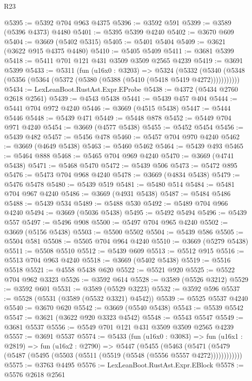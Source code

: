 \begin{lexlean}{R23}
\begin{coremodule}
@5395 := @5392 @704 @963 @4375
@5396 := @3592 @591
@5399 := @3589 (@5396 @4373) @4480
@5401 := @5395 @5399 @4240
@5402 := @3670 @609
@5404 := @3669 (@5402 @5315)
@5405 := @5401 @5404
@5409 := @3621 (@3622 @915 @4375 @4480)
@5410 := @5405 @5409
@5411 := @3681 @5399
@5418 := @5411 @701 @121 @431 @3509 @3509 @2565 @4239
@5419 := @3691 @5399
@5433 := @5311
    (fun (u16x0 : @3203) =>
    @5324
      (@5332 (@5340 (@5348 (@5356 (@5364 (@5372 (@5380 (@5388 (@5410 (@5418 @5419 @4272)))))))))))
@5434 := LexLeanBoot.RustAst.Expr.EProbe
@5438 := @4372 (@5434 @2760 @2618 @2561)
@5439 := @4543 @5438
@5441 := @5439 @457 @404
@5444 := @5441 @704 @972 @4240
@5446 := @3669 (@4515 @5438)
@5447 := @5444 @5446
@5448 := @5439 @471
@5449 := @5448 @878
@5452 := @5449 @704 @971 @4240
@5454 := @3669 (@4577 @5438)
@5455 := @5452 @5454
@5456 := @5439 @482
@5457 := @5456 @478
@5460 := @5457 @704 @970 @4240
@5462 := @3669 (@4649 @5438)
@5463 := @5460 @5462
@5464 := @5439 @493
@5465 := @5464 @888
@5468 := @5465 @704 @969 @4240
@5470 := @3669 (@4741 @5438)
@5471 := @5468 @5470
@5472 := @5439 @506
@5473 := @5472 @895
@5476 := @5473 @704 @968 @4240
@5478 := @3669 (@4834 @5438)
@5479 := @5476 @5478
@5480 := @5439 @519
@5481 := @5480 @514
@5484 := @5481 @704 @967 @4240
@5486 := @3669 (@4931 @5438)
@5487 := @5484 @5486
@5488 := @5439 @534
@5489 := @5488 @530
@5492 := @5489 @704 @966 @4240
@5494 := @3669 (@5036 @5438)
@5495 := @5492 @5494
@5496 := @5439 @557
@5497 := @5496 @908
@5500 := @5497 @704 @965 @4240
@5502 := @3669 (@5156 @5438)
@5503 := @5500 @5502
@5504 := @5439 @586
@5505 := @5504 @581
@5508 := @5505 @704 @964 @4240
@5510 := @3669 (@5279 @5438)
@5511 := @5508 @5510
@5512 := @5439 @609
@5513 := @5512 @915
@5516 := @5513 @704 @963 @4240
@5518 := @3669 (@5402 @5438)
@5519 := @5516 @5518
@5521 := @4558 @5438 @620
@5522 := @5521 @920
@5525 := @5522 @704 @962 @3323
@5526 := @3592 @614
@5528 := @3589 (@5526 @3212)
@5529 := @3592 @601
@5531 := @3589 (@5529 @3223)
@5532 := @3592 @596
@5537 := @5528 (@5531 (@3589 (@5532 @3321) @4542))
@5539 := @5525 @5537 @4240
@5540 := @3670 @620
@5542 := @3669 (@5540 @5438)
@5543 := @5539 @5542
@5547 := @3621 (@3622 @920 @3323 @4542)
@5548 := @5543 @5547
@5549 := @3681 @5537
@5556 := @5549 @701 @121 @431 @3509 @3509 @2565 @4239
@5557 := @3691 @5537
@5574 := @5433
    (fun (u16x0 : @3083) =>
    fun (u16x1 : @2819) =>
    fun (u16x2 : @2790) =>
    @5447
      (@5455
        (@5463
          (@5471 (@5479 (@5487 (@5495 (@5503 (@5511 (@5519 (@5548 (@5556 @5557 @4272))))))))))))
@5575 := @3763 @4495
@5576 := LexLeanBoot.RustAst.Expr.EBlock
@5578 := @5576 @2618 @2561

\end{coremodule}
\end{lexlean}
